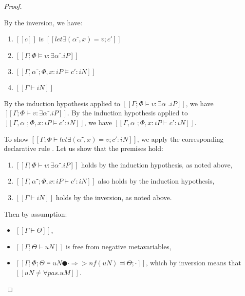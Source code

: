 \begin{proof}
\begin{caseof}
        \item {}
        By the inversion, we have:
        \begin{enumerate}
            \item $[[c]]$ is $[[let∃ (α⁻, x) = v; c']]$
            \item $[[Γ; Φ ⊨ v : ∃α⁻.iP]]$
            \item $[[Γ, α⁻ ; Φ, x:iP ⊨ c' : iN]]$
            \item $[[Γ ⊢ iN]]$
        \end{enumerate}

        By the induction hypothesis applied to 
        $[[Γ; Φ ⊨ v : ∃α⁻.iP]]$, we have $[[Γ; Φ ⊢ v : ∃α⁻.iP]]$.
        By the induction hypothesis applied to
        $[[Γ, α⁻ ; Φ, x:iP ⊨ c' : iN]]$, we have $[[Γ, α⁻ ; Φ, x:iP ⊢ c' : iN]]$.

        To show $[[Γ; Φ ⊢ let∃ (α⁻, x) = v; c' : iN]]$, we apply the corresponding
        declarative rule . Let us show that the premises hold:
        \begin{enumerate}
            \item $[[Γ ; Φ ⊢ v : ∃α⁻.iP]]$ holds by the induction hypothesis, as noted above,
            \item $[[Γ, α⁻ ; Φ, x:iP ⊢ c' : iN]]$ also holds by the induction hypothesis,
            \item $[[Γ ⊢ iN]]$ holds by the inversion, as noted above.
        \end{enumerate}

        \item {}
        Then by assumption:
        \begin{itemize}
            \item $[[Γ ⊢ Θ]]$,
            \item $[[Γ; Θ ⊢ uN]]$ is free from negative metavariables,
            \item $[[Γ; Φ; Θ ⊨ uN ● · ⇒> nf(uN) ⫤ Θ; ·]]$, which by inversion means that $[[uN ≠ ∀pas.uM]]$.
        \end{itemize}


\end{caseof}
\end{proof}
